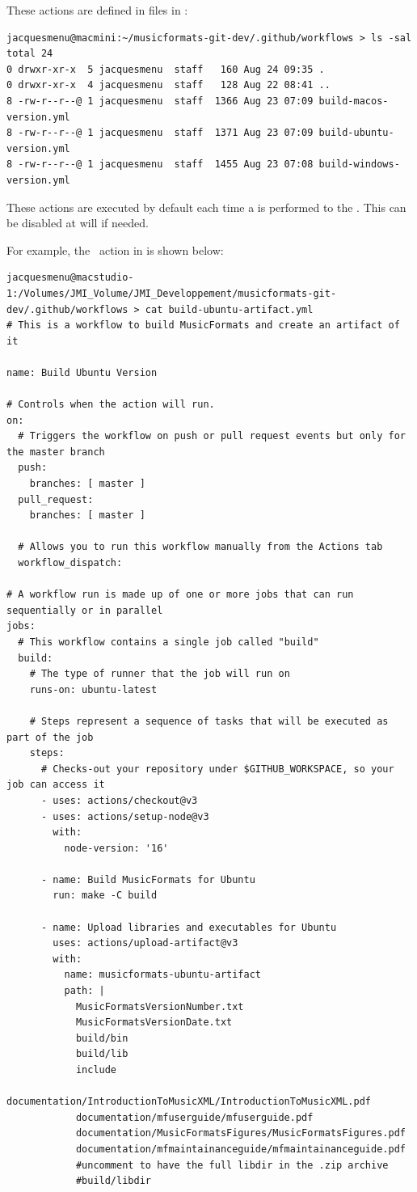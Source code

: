These actions are defined in  files in :
\begin{lstlisting}[language=Terminal]
jacquesmenu@macmini:~/musicformats-git-dev/.github/workflows > ls -sal
total 24
0 drwxr-xr-x  5 jacquesmenu  staff   160 Aug 24 09:35 .
0 drwxr-xr-x  4 jacquesmenu  staff   128 Aug 22 08:41 ..
8 -rw-r--r--@ 1 jacquesmenu  staff  1366 Aug 23 07:09 build-macos-version.yml
8 -rw-r--r--@ 1 jacquesmenu  staff  1371 Aug 23 07:09 build-ubuntu-version.yml
8 -rw-r--r--@ 1 jacquesmenu  staff  1455 Aug 23 07:08 build-windows-version.yml
\end{lstlisting}

These actions are executed by default each time a  is performed to the \masterBranch. This can be disabled at will if needed.

For example, the \Ubuntu\ action in  is shown below:
\begin{lstlisting}[language=Terminal]
jacquesmenu@macstudio-1:/Volumes/JMI_Volume/JMI_Developpement/musicformats-git-dev/.github/workflows > cat build-ubuntu-artifact.yml
# This is a workflow to build MusicFormats and create an artifact of it

name: Build Ubuntu Version

# Controls when the action will run.
on:
  # Triggers the workflow on push or pull request events but only for the master branch
  push:
    branches: [ master ]
  pull_request:
    branches: [ master ]

  # Allows you to run this workflow manually from the Actions tab
  workflow_dispatch:

# A workflow run is made up of one or more jobs that can run sequentially or in parallel
jobs:
  # This workflow contains a single job called "build"
  build:
    # The type of runner that the job will run on
    runs-on: ubuntu-latest

    # Steps represent a sequence of tasks that will be executed as part of the job
    steps:
      # Checks-out your repository under $GITHUB_WORKSPACE, so your job can access it
      - uses: actions/checkout@v3
      - uses: actions/setup-node@v3
        with:
          node-version: '16'

      - name: Build MusicFormats for Ubuntu
        run: make -C build

      - name: Upload libraries and executables for Ubuntu
        uses: actions/upload-artifact@v3
        with:
          name: musicformats-ubuntu-artifact
          path: |
            MusicFormatsVersionNumber.txt
            MusicFormatsVersionDate.txt
            build/bin
            build/lib
            include
            documentation/IntroductionToMusicXML/IntroductionToMusicXML.pdf
            documentation/mfuserguide/mfuserguide.pdf
            documentation/MusicFormatsFigures/MusicFormatsFigures.pdf
            documentation/mfmaintainanceguide/mfmaintainanceguide.pdf
            #uncomment to have the full libdir in the .zip archive
            #build/libdir
\end{lstlisting}

